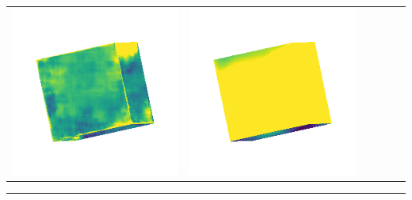 \begin{tabularx}{\linewidth}{@{}Y@{}Y@{}Y@{}Y@{}Y@{}Y@{}}
\includegraphics[width=\linewidth]{semisynthetic/20150514_0_marrnet_err.png} &
\includegraphics[width=\linewidth]{semisynthetic/20150514_0_ef_err.png} \\
\end{tabularx}
\begin{center}\rule{0.5\linewidth}{\linethickness}\end{center}


